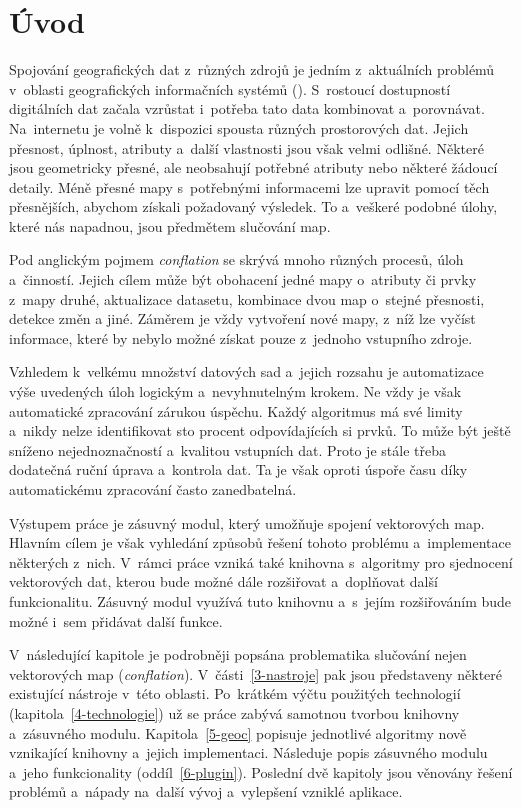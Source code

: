 \chapter{Úvod}
\label{1-uvod}

Spojování geografických dat z~různých zdrojů je jedním z~aktuálních
problémů v~oblasti geografických informačních systémů (). 
S~rostoucí dostupností di\-gitálních dat začala vzrůstat i~potřeba 
tato data kombinovat a~porovnávat. Na~internetu je volně k~dispozici 
spousta různých prostorových dat. Jejich přes\-nost, úplnost, 
atributy a~další vlastnosti jsou však velmi odlišné. Některé jsou 
geo\-metricky přesné, ale neobsahují potřebné atributy nebo některé 
žádoucí detaily. Méně přesné mapy s~potřebnými informacemi lze upravit 
pomocí těch přesnějších, abychom získali požadovaný výsledek. To 
a~veškeré podobné úlohy, které nás napadnou, jsou předmětem slučování 
map.

Pod anglickým pojmem \textit{conflation} se skrývá mnoho různých
procesů, úloh a~činností. Jejich cílem může být obohacení jedné mapy 
o~atributy či prvky z~mapy druhé, aktualizace datasetu, kombinace 
dvou map o~stejné přesnosti, detekce změn a jiné. Záměrem je vždy 
vytvoření nové mapy, z~níž lze vyčíst informace, které by nebylo možné
získat pouze z~jednoho vstupního zdroje.

Vzhledem k~velkému množství datových sad a~jejich rozsahu je automatizace
výše uvedených úloh logickým a~nevyhnutelným krokem. Ne vždy je však
automatické zpracování zárukou úspěchu. Každý algoritmus má své limity
a~nikdy nelze identifi\-kovat sto procent odpovídajících si prvků. To může
být ještě sníženo nejednoznač\-ností a~kvalitou vstupních dat. Proto je 
stále třeba dodatečná ruční úprava a~kontrola dat. Ta je však oproti 
úspoře času díky automatickému zpra\-co\-vání často za\-ne\-dbatelná.

Výstupem práce je zásuvný modul, který umožňuje spojení vektorových 
map. Hlavním cílem je však vyhledání způsobů řešení tohoto problému 
a~implementace některých z~nich. V~rámci práce vzniká také knihovna 
s~algoritmy pro sjednocení vektorových dat, kterou bude možné dále 
rozšiřovat a~doplňovat další funkcionalitu. Zásuvný modul využívá 
tuto knihovnu a~s~jejím rozšiřováním bude možné i~sem přidávat další 
funkce.   

V~následující kapitole je podrobněji popsána problematika slučování 
nejen vektorových map (\textit{conflation}). V~části~\ref{3-nastroje} 
pak jsou představeny některé existující nástroje v~této oblasti. 
Po~krátkém výčtu použitých technologií (kapitola~\ref{4-technologie})
už se práce zabývá samotnou tvorbou knihovny a~zásuvného modulu. 
Kapitola~\ref{5-geoc} popisuje jednotlivé algoritmy nově vznikající
knihovny a~jejich implementaci. Následuje popis zásuvného modulu 
a~jeho funkcionality (oddíl~\ref{6-plugin}). Poslední dvě kapitoly 
jsou věnovány řešení problémů a~nápady na~další vývoj a~vylepšení 
vzniklé aplikace.  

